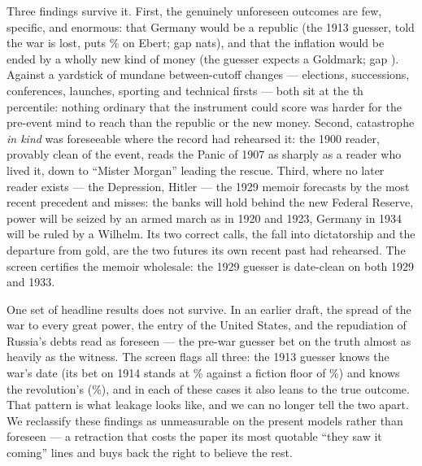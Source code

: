 \documentclass[11pt]{article}
\begin{document}
Three findings survive it. First, the genuinely unforeseen outcomes are few, specific, and enormous: that
Germany would be a republic (the 1913 guesser, told the war is lost, puts \NkaiserPreImplied\% on Ebert;
gap \NkaiserGap{} nats), and that the inflation would be ended by a wholly new kind of money (the guesser
expects a Goldmark; gap \NinflendGap{}). Against a yardstick of \NmundaneN{} mundane between-cutoff
changes --- elections, successions, conferences, launches, sporting and technical firsts --- both sit at
the \NkaiserMundanePct th percentile: nothing ordinary that the instrument could score was harder for
the pre-event mind to reach than the republic or the new money.
Second, catastrophe \emph{in kind} was foreseeable where the record had rehearsed it: the 1900 reader,
provably clean of the event, reads the Panic of 1907 as sharply as a reader who lived it, down to
``Mister Morgan'' leading the rescue. Third, where no later reader exists --- the Depression, Hitler ---
the 1929 memoir forecasts by the most recent precedent and misses: the banks will hold behind the new
Federal Reserve, power will be seized by an armed march as in 1920 and 1923, Germany in 1934 will be
ruled by a Wilhelm. Its two correct calls, the fall into dictatorship and the departure from gold, are
the two futures its own recent past had rehearsed. The screen certifies the memoir wholesale: the 1929
guesser is date-clean on both 1929 and 1933.

One set of headline results does not survive. In an earlier draft, the spread of the war to every great
power, the entry of the United States, and the repudiation of Russia's debts read as foreseen --- the
pre-war guesser bet on the truth almost as heavily as the witness. The screen flags all three: the 1913
guesser knows the war's date (its bet on 1914 stands at \NdateWar\% against a fiction floor of
\NfloorThirteen\%) and knows the revolution's (\NdateRev\%), and in each of these cases it also leans to
the true outcome. That pattern is what leakage looks like, and we can no longer tell the two apart. We
reclassify these findings as unmeasurable on the present models rather than foreseen --- a retraction
that costs the paper its most quotable ``they saw it coming'' lines and buys back the right to believe
the rest.
\end{document}

